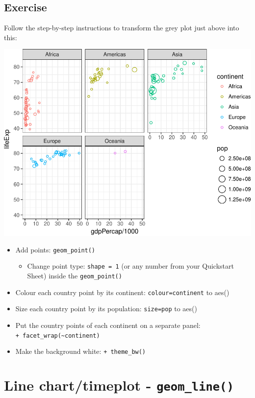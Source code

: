 \documentclass[12pt,]{krantz}
\providecommand{\tightlist}{%
  \setlength{\itemsep}{0pt}\setlength{\parskip}{0pt}}
\theoremstyle{definition}
\theoremstyle{definition}
\theoremstyle{definition}
\theoremstyle{remark}
\begin{document}
\hypertarget{exercise-18}{%
\subsection{Exercise}\label{exercise-18}}

Follow the step-by-step instructions to transform the grey plot just
above into this:

\includegraphics{04_plotting_files/figure-latex/unnamed-chunk-3-1.pdf}

\begin{itemize}
\tightlist
\item
  Add points: \texttt{geom\_point()}

  \begin{itemize}
  \tightlist
  \item
    Change point type: \texttt{shape\ =\ 1} (or any number from your
    Quickstart Sheet) inside the \texttt{geom\_point()}
  \end{itemize}
\item
  Colour each country point by its continent: \texttt{colour=continent}
  to aes()
\item
  Size each country point by its population: \texttt{size=pop} to aes()
\item
  Put the country points of each continent on a separate panel:
  \texttt{+\ facet\_wrap(\textasciitilde{}continent)}
\item
  Make the background white: \texttt{+\ theme\_bw()}
\end{itemize}

\hypertarget{line-charttimeplot---geom_line}{%
\section{\texorpdfstring{Line chart/timeplot -
\texttt{geom\_line()}}{Line chart/timeplot - geom\_line()}}\label{line-charttimeplot---geom_line}}
\end{document}

